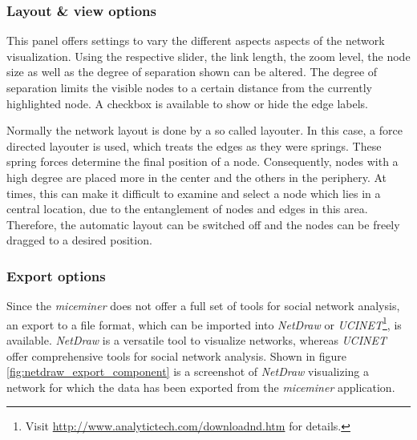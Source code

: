 \subsubsection*{Layout \& view options}

This panel offers settings to vary the different aspects aspects of the network visualization. Using the respective slider, the link length, the zoom level, the node size as well as the degree of separation shown can be altered. The degree of separation limits the visible nodes to a certain distance from the currently highlighted node. A checkbox is available to show or hide the edge labels.

Normally the network layout is done by a so called layouter. In this case, a force directed layouter is used, which treats the edges as they were springs. These spring forces determine the final position of a node. Consequently, nodes with a high degree are placed more in the center and the others in the periphery. At times, this can make it difficult to examine and select a node which lies in a central location, due to the entanglement of nodes and edges in this area. Therefore, the automatic layout can be switched off and the nodes can be freely dragged to a desired position.

\subsubsection*{Export options}

Since the \textit{miceminer} does not offer a full set of tools for social network analysis, an export to a file format, which can be imported into \textit{NetDraw} or \textit{UCINET}\footnote{Visit \href{http://www.analytictech.com/downloadnd.htm}{http://www.analytictech.com/downloadnd.htm} for details.}, is available. \textit{NetDraw} is a versatile tool to visualize networks, whereas \textit{UCINET} offer comprehensive tools for social network analysis. Shown in figure \ref{fig:netdraw_export_component} is a screenshot of \textit{NetDraw} visualizing a network for which the data has been exported from the \textit{miceminer} application.

